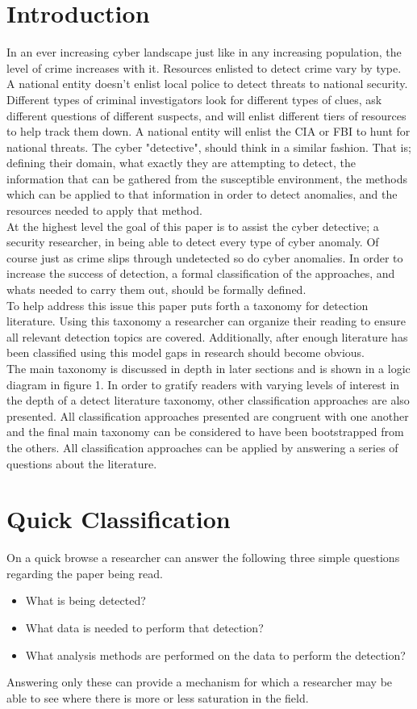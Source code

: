 \documentclass[10pt]{IEEEtran}
\begin{document}
\section{Introduction}
In an ever increasing cyber landscape just like in any increasing population, the level of crime increases with it. Resources enlisted to detect crime vary by type. A national entity doesn't enlist local police to detect threats to national security. Different types of criminal investigators look for different types of clues, ask different questions of different suspects, and will enlist different tiers of resources to help track them down. A national entity will enlist the CIA or FBI to hunt for national threats. The cyber "detective", should think in a similar fashion. That is; defining their domain, what exactly they are attempting to detect, the information that can be gathered from the susceptible environment, the methods which can be applied to that information in order to detect anomalies, and the resources needed to apply that method. \\
At the highest level the goal of this paper is to assist the cyber detective; a security researcher, in being able to detect every type of cyber anomaly. Of course just as crime slips through undetected so do cyber anomalies. In order to increase the success of detection, a formal classification of the approaches, and whats needed to carry them out, should be formally defined. \\
To help address this issue this paper puts forth a taxonomy for detection literature. Using this taxonomy a researcher can organize their reading to ensure all relevant detection topics are covered. Additionally, after enough literature has been classified using this model gaps in research should become obvious.\\
The main taxonomy is discussed in depth in later sections and is shown in a logic diagram in figure 1. In order to gratify readers with varying levels of interest in the depth of a detect literature taxonomy, other classification approaches are also presented. All classification approaches presented are congruent with one another and the final main taxonomy can be considered to have been bootstrapped from the others. All classification approaches can be applied by answering a series of questions about the literature.

\section{Quick Classification}
On a quick browse a researcher can answer the following three simple questions regarding the paper being read. 
\begin{itemize}
    \item What is being detected?
    \item What data is needed to perform that detection?
    \item What analysis methods are performed on the data to perform the detection?
\end{itemize}
Answering only these can provide a mechanism for which a researcher may be able to see where there is more or less saturation in the field.
\end{document}
